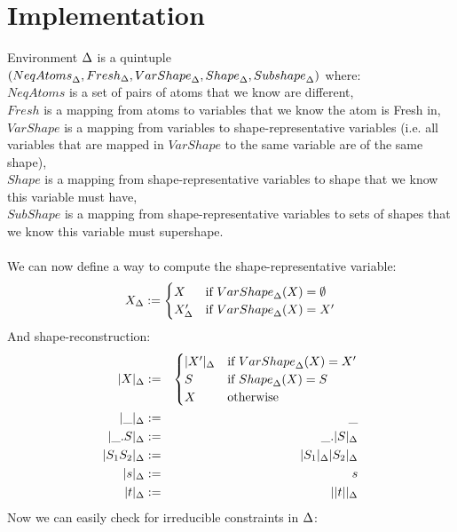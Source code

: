 \documentclass[english, mgr]{iithesis}
\begin{document}
\section{Implementation}
Environment $\Delta$ is a quintuple
$({NeqAtoms}_{\Delta}
, {Fresh}_{\Delta}
, {VarShape}_{\Delta}
, {Shape}_{\Delta}
, {Subshape}_{\Delta}
)$ where: \\
$NeqAtoms$ is a set of pairs of atoms that we know are different, \\
$Fresh$ is a mapping from atoms to variables that we know the atom is {Fresh} in,\\
$VarShape$ is a mapping from variables to shape-representative variables (i.e. all variables that are mapped in $VarShape$ to the same variable are of the same shape),\\
$Shape$ is a mapping from shape-representative variables to shape that we know this variable must have,\\
$SubShape$ is a mapping from shape-representative variables to sets of shapes that we know this variable must supershape.
\\
\\
\newcommand{\shrep}[2][\icEnv]{\ensuremath{ #2_{#1}}}
\newcommand{\shenv}[2][\icEnv]{\ensuremath{ |#2|_{#1}}}
We can now define a way to compute the shape-representative variable:
$$
\shrep{\termv} :=
     \begin{cases}
      \termv          &\text{if } {VarShape}_{\icEnv}(\termv) = \emptyset \\
       \shrep{\termv'} &\text{if } {VarShape}_{\icEnv}(\termv) = \termv'
     \end{cases}
$$
And shape-reconstruction:
\begin{eqnarray*}
  \shenv{\termv}                 &:=&
  \begin{cases}
    \shenv{\termv'} &\text{if } {VarShape}_{\icEnv}(\termv) = \termv' \\
    \shape          &\text{if } {Shape}_{\icEnv}(\termv) = \shape \\
    \termv          &\text{otherwise}
  \end{cases} \\
  \shenv{\shatom}           &:=& \shatom \\
  \shenv{\shbind \shape}    &:=& \shbind \shenv{\shape} \\
  \shenv{\shape_1 \shape_2} &:=& \shenv{\shape_1} \shenv{\shape_2}\\
  \shenv{\symb}             &:=& \symb \\
  \shenv{\term}             &:=& \shenv{|\term|}
\end{eqnarray*}
\newcommand{\occurs}[2]{\ensuremath{ {#1}\text{ occurs in }{#2}}}
\newcommand{\stxoccurs}[2]{\ensuremath{ {#1}\text{ occurs syntactically in }{#2}}}
\newcommand{\pluseq}{\mathrel{+}=}
\newcommand{\minuseq}{\mathrel{-}=}
Now we can easily check for irreducible constraints in $\Delta$:
\end{document}
